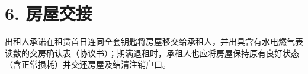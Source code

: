 \section*{6. 房屋交接}
出租人承诺在租赁首日连同全套钥匙将房屋移交给承租人，并出具含有水电燃气表读数的交房确认表（协议书）；期满退租时，承租人也应将房屋保持原有良好状态（含正常损耗）并交还房屋及结清注销户口。
